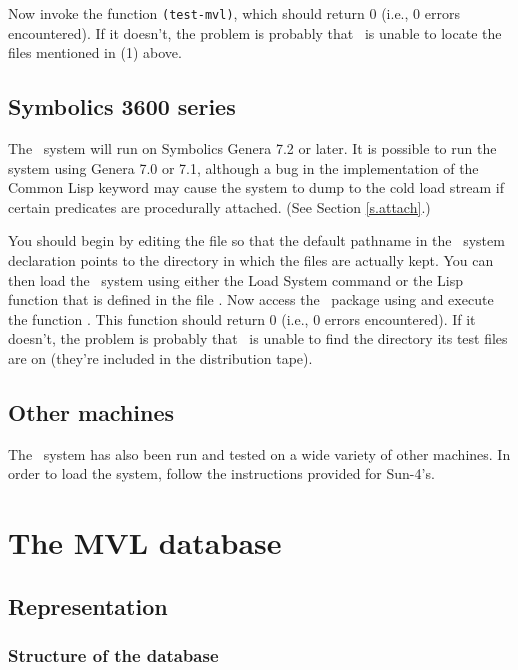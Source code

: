 Now invoke the function {\tt (test-mvl)}, which should return 0
(i.e., 0 errors encountered).  If it doesn't, the problem is probably
that \mvl\ is unable to locate the files mentioned in (1) above.

\subsection{Symbolics 3600 series}

The \mvl\ system will run on Symbolics Genera 7.2 or later.  It is
possible to run the system using Genera 7.0 or 7.1, although a bug in
the implementation of the Common Lisp 
keyword may cause the system to dump to the cold load stream if
certain predicates are procedurally attached.  (See Section
\ref{s.attach}.)

You should begin by editing the file  so that the
default pathname in the \mvl\ system declaration points to the
directory in which the files are actually kept.  You can then load
the \mvl\ system using either the Load System command or the Lisp
function  that is defined in the
file .  Now access the \mvl\ package using
 and execute the function .
This function should return 0 (i.e., 0 errors encountered).  If it
doesn't, the problem is probably that \mvl\ is unable to find the
directory its test files are on (they're included in the distribution
tape).

\subsection{Other machines}

The \mvl\ system has also been run and tested on a wide variety of
other machines.  In order to load the system, follow the instructions
provided for Sun-4's.

\section{The MVL database}
\label{s.fol1}
\subsection{Representation}
\subsubsection{Structure of the database}
\label{s.rep}

